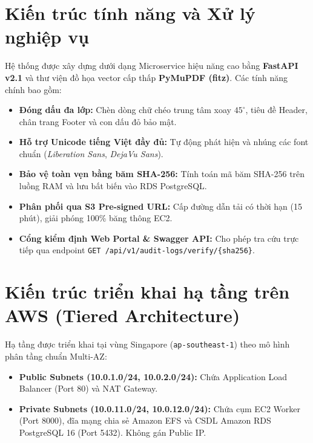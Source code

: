 \documentclass[12pt,a4paper]{report}
\begin{document}
\section{Kiến trúc tính năng và Xử lý nghiệp vụ}
Hệ thống được xây dựng dưới dạng Microservice hiệu năng cao bằng \textbf{FastAPI v2.1} và thư viện đồ họa vector cấp thấp \textbf{PyMuPDF (fitz)}. Các tính năng chính bao gồm:
\begin{itemize}
    \item \textbf{Đóng dấu đa lớp:} Chèn dòng chữ chéo trung tâm xoay $45^\circ$, tiêu đề Header, chân trang Footer và con dấu đỏ bảo mật.
    \item \textbf{Hỗ trợ Unicode tiếng Việt đầy đủ:} Tự động phát hiện và nhúng các font chuẩn (\textit{Liberation Sans}, \textit{DejaVu Sans}).
    \item \textbf{Bảo vệ toàn vẹn bằng băm SHA-256:} Tính toán mã băm SHA-256 trên luồng RAM và lưu bất biến vào RDS PostgreSQL.
    \item \textbf{Phân phối qua S3 Pre-signed URL:} Cấp đường dẫn tải có thời hạn (15 phút), giải phóng 100\% băng thông EC2.
    \item \textbf{Cổng kiểm định Web Portal \& Swagger API:} Cho phép tra cứu trực tiếp qua endpoint \texttt{GET /api/v1/audit-logs/verify/\{sha256\}}.
\end{itemize}

\section{Kiến trúc triển khai hạ tầng trên AWS (Tiered Architecture)}
Hạ tầng được triển khai tại vùng Singapore (\texttt{ap-southeast-1}) theo mô hình phân tầng chuẩn Multi-AZ:
\begin{itemize}
    \item \textbf{Public Subnets (10.0.1.0/24, 10.0.2.0/24):} Chứa Application Load Balancer (Port 80) và NAT Gateway.
    \item \textbf{Private Subnets (10.0.11.0/24, 10.0.12.0/24):} Chứa cụm EC2 Worker (Port 8000), đĩa mạng chia sẻ Amazon EFS và CSDL Amazon RDS PostgreSQL 16 (Port 5432). Không gán Public IP.
\end{itemize}
\end{document}
